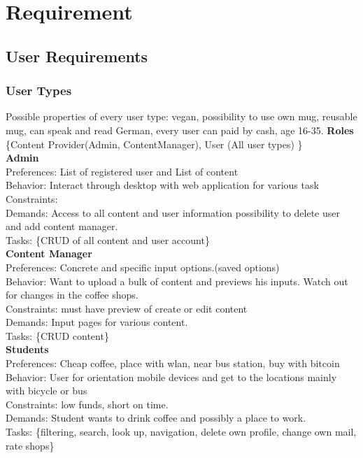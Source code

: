 \section{Requirement}
\subsection{User Requirements}
\subsubsection{User Types}
Possible properties of every user type: vegan, possibility to use own mug, reusable mug, can speak and read German, every user can paid by cash, age 16-35.
\textbf{Roles} \{Content Provider(Admin, ContentManager), User (All user types) \}\\
\textbf{Admin}\\
Preferences: List of registered user and List of content \\
Behavior: Interact through desktop with web application for various task\\
Constraints: \\
Demands: Access to all content and user information possibility to delete user and add content manager.\\
Tasks: \{CRUD of all content and user account\}\\
\textbf{Content Manager}\\
Preferences: Concrete and specific input options.(saved options)\\
Behavior: Want to upload a bulk of content and previews his inputs. Watch out for changes in the coffee shops.\\
Constraints:  must have preview of create or edit content\\
Demands: Input pages for various content.\\
Tasks: \{CRUD content\}\\
\textbf{Students}\\
Preferences: Cheap coffee, place with wlan, near bus station, buy with bitcoin\\
Behavior: User for orientation mobile devices and get to the locations mainly with bicycle or bus\\
Constraints:  low funds, short on time.\\
Demands: Student wants to drink coffee and possibly a place to work.\\
Tasks: \{filtering, search, look up, navigation, delete own profile, change own mail, rate shops\}\\
